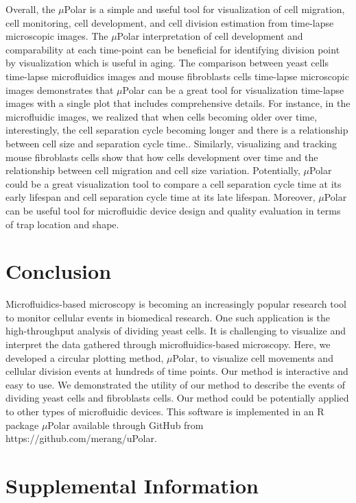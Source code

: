 \documentclass[conference]{IEEEtran}
\begin{document}
Overall, the $\mu$Polar is a simple and useful tool for visualization of cell migration, cell monitoring, cell development, and cell division estimation from time-lapse microscopic images. The $\mu$Polar interpretation of cell development and comparability at each time-point can be beneficial for identifying division point by visualization which is useful in aging. The comparison between yeast cells time-lapse microfluidics images and mouse fibroblasts cells time-lapse microscopic images demonstrates that $\mu$Polar can be a great tool for visualization time-lapse images with a single plot that includes comprehensive details. For instance, in the microfluidic images, we realized that when cells becoming older over time, interestingly, the cell separation cycle becoming longer and there is a relationship between cell size and separation cycle time.. Similarly, visualizing and tracking mouse fibroblasts cells show that  how cells development over time  and the relationship between cell migration and cell size variation. Potentially, $\mu$Polar could be a great visualization tool to compare a cell separation cycle time at its early lifespan and cell separation cycle time at its late lifespan. Moreover, $\mu$Polar can be useful tool for microfluidic device design and quality evaluation in terms of  trap location and shape. 


\section{Conclusion}
Microfluidics-based microscopy is becoming an increasingly popular research tool to monitor cellular events in biomedical research. One such application is the high-throughput analysis of dividing yeast cells. It is challenging to visualize and interpret the data gathered through microfluidics-based microscopy. Here, we developed a circular plotting method, $\mu$Polar, to visualize cell movements and cellular division events at hundreds of time points. Our method is interactive and easy to use. We demonstrated the utility of our method to describe the events of dividing yeast cells and fibroblasts cells. Our method could be potentially applied to other types of microfluidic devices. This software is implemented in an R package $\mu$Polar available through GitHub from https://github.com/merang/uPolar.

\section{Supplemental Information}
\end{document}
